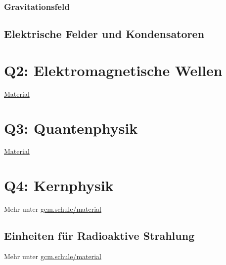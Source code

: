 \documentclass{article}
\begin{document}
            \subsubsection{Gravitationsfeld}

        \subsection{Elektrische Felder und Kondensatoren}

    \section{Q2: Elektromagnetische Wellen}

    \href{https://gcm.schule/material/2023/physik/lk12/#q1}{Material}

    \section{Q3: Quantenphysik}

    \href{https://gcm.schule/material/2022/physik/lk13/}{Material}

    \section{Q4: Kernphysik}

        Mehr unter \href{https://gcm.schule/material/2024/physik/lk13/}{gcm.schule/material}

        \subsection{Einheiten für Radioaktive Strahlung}

        Mehr unter \href{https://gcm.schule/material/2024/physik/lk13/q4_wopla-05.md}{gcm.schule/material}
\end{document}
